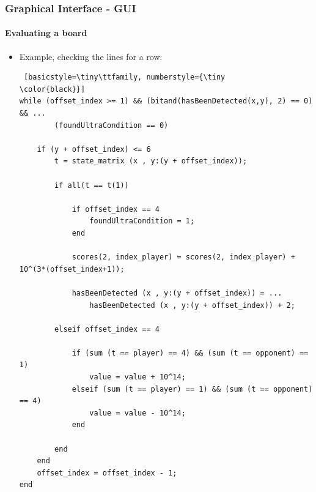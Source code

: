 \documentclass[10pt]{beamer}
\begin{document}
\begin{frame} [fragile]
\frametitle{Graphical Interface - GUI}
\framesubtitle{Evaluating a board}

\begin{itemize}
  \item Example, checking the lines for a row:\\
\begin{lstlisting} [basicstyle=\tiny\ttfamily, numberstyle={\tiny
\color{black}}] 
while (offset_index >= 1) && (bitand(hasBeenDetected(x,y), 2) == 0) && ...
        (foundUltraCondition == 0)
    
    if (y + offset_index) <= 6
        t = state_matrix (x , y:(y + offset_index));
        
        if all(t == t(1))
           
            if offset_index == 4
                foundUltraCondition = 1;
            end
            
            scores(2, index_player) = scores(2, index_player) + 10^(3*(offset_index+1));
           
            hasBeenDetected (x , y:(y + offset_index)) = ...
                hasBeenDetected (x , y:(y + offset_index)) + 2;
            
        elseif offset_index == 4
            
            if (sum (t == player) == 4) && (sum (t == opponent) == 1)
                value = value + 10^14;
            elseif (sum (t == player) == 1) && (sum (t == opponent) == 4)
                value = value - 10^14;
            end
            
        end   
    end
    offset_index = offset_index - 1;
end
\end{lstlisting}
  
\end{itemize}
\end{frame}

\end{document}
